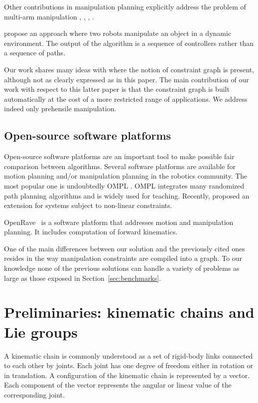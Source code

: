 Other contributions in manipulation planning explicitly address the problem of multi-arm manipulation \cite{GhaCorSim2009}, \cite{HarTsuLau2014}, \cite{DobBek2015}, \cite{XiaLerPha2017}.

\cite{schmitt19icra} propose an approach where two robots manipulate an object in a dynamic environment. The output of the algorithm is a sequence of controllers rather than a sequence of paths.

Our work shares many ideas with \cite{HauNgt2011} where the notion of constraint
graph is present, although not as clearly expressed as in this paper. The main
contribution of our work with respect to this latter paper is that the
constraint graph is built automatically at the cost of a more restricted range
of applications. We address indeed only prehensile manipulation.

\subsection{Open-source software platforms}

Open-source software platforms are an important tool to make possible fair
comparison between algorithms.
Several software platforms are available for motion planning and/or manipulation
planning in the robotics community. The most popular one is undoubtedly OMPL \cite{ompl2012}. OMPL integrates many randomized path planning algorithms and is widely used for teaching. Recently, \cite{KinMolKav2019} proposed an extension for systems subject to non-linear constraints.

OpenRave~\cite{diankov_thesis} is
a software platform that addresses motion and manipulation planning. It includes
computation of forward kinematics.

One of the main differences between our solution and the previously cited ones resides in the way manipulation constraints are compiled into a graph. To our knowledge none of the previous solutions can handle a variety of problems as large as those exposed in Section~\ref{sec:benchmarks}.

\section{Preliminaries: kinematic chains and Lie groups}\label{partie:preliminary}

A kinematic chain is commonly understood as a set of rigid-body links connected
to each other by joints. Each joint has one degree of freedom either in
rotation or in translation. A configuration of the kinematic chain is represented by a vector. Each component of the vector represents the angular or linear value of the corresponding joint.

